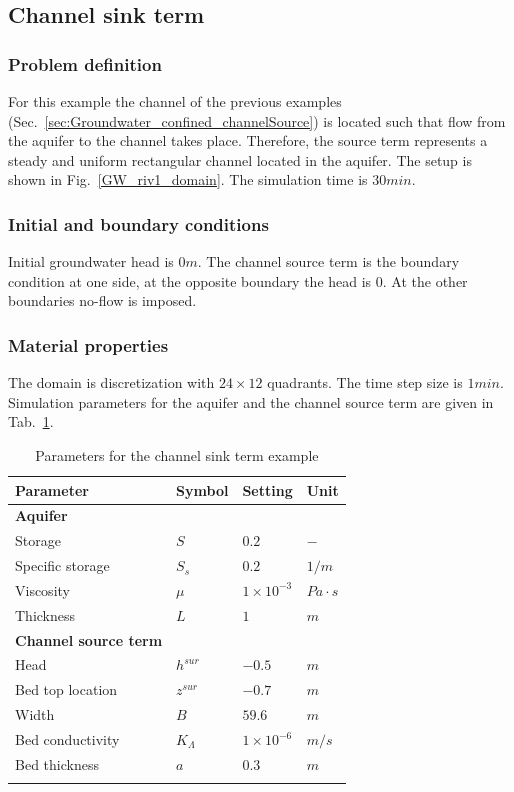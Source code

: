 \subsection{Channel sink term}
%
\subsubsection*{Problem definition}
%

For this example the channel of the previous examples (Sec.~\ref{sec:Groundwater_confined_channelSource}) is located such that flow from the aquifer to the channel takes place. Therefore, the source term represents a steady and uniform rectangular channel located in the aquifer. The setup is shown in Fig.~\ref{GW_riv1_domain}. The simulation time is $30min$.


\subsubsection*{Initial and boundary conditions}
%
Initial groundwater head is $0m$. The channel source term is the boundary condition at one side, at the opposite boundary the head is $0$. At the other boundaries no-flow is imposed.
\subsubsection*{Material properties}
%
The domain is discretization with $24\times 12$ quadrants. The time step size is $1 min$.
Simulation parameters for the aquifer and the channel source term are given in Tab.~\ref{GW_ChannelPercolation}.
%
\begin{table}[H]
 \centering
 \caption{Parameters for the channel sink term example}
 \centering \label{GW_ChannelPercolation}
 \begin{tabular}{llll}
 \hline\hline\noalign{\smallskip}
 {\bf Parameter} & {\bf Symbol} & {\bf Setting} & {\bf Unit} \\ \hline
 {\bf Aquifer} & & & \\
 Storage & $S$ & $0.2$ & $-$ \\
 Specific storage & $S_s$ & $0.2$ & $1/m$ \\
 Viscosity  & $\mu$ & $1\times 10^{-3}$ & $Pa\cdot s$\\
 Thickness & $L$ & $1$ & $m$ \\ \hline
 {\bf Channel source term} & & & \\
 Head & $h^{sur}$ & $-0.5$ & $m$ \\
 Bed top location& $z^{sur}$ & $-0.7$ & $m$ \\
 Width & $B$ & $59.6$ & $m$ \\
 Bed conductivity & $K_{\Lambda}$ & $1\times 10^{-6}$ & $m/s$ \\
 Bed thickness & $a$ & $0.3$ & $m$ \\
 \noalign{\smallskip}\hline\hline
 \end{tabular}
\end{table}
%
